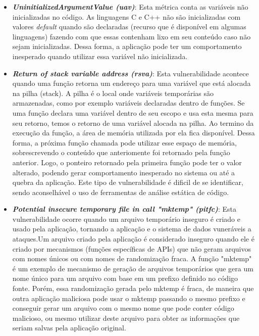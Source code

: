 \begin{itemize}
\item \textbf{\emph{UninitializedArgumentValue (uav)}}: Esta métrica conta as variáveis não inicializadas no código. As linguagens C e C++ não são inicializadas com valores \emph{default} quando são declaradas (recurso que é disponível em algumas linguagens) fazendo com que essas contenham lixo em seu conteúdo caso não sejam inicializadas. Dessa forma, a aplicação pode ter um comportamento inesperado quando utilizar essa variável não inicializada.

%

\item \textbf{\emph{Return of stack variable address (rsva)}}: Esta vulnerabilidade acontece quando uma função retorna um endereço para uma variável que está alocada na pilha (stack). A pilha é o local onde variáveis temporárias são armazenadas, como por exemplo variáveis declaradas dentro de funções. Se uma função declara uma variável dentro de seu escopo e usa esta mesma para seu retorno, temos o retorno de uma variável alocada na pilha. Ao termino da execução da função, a área de memória utilizada por ela fica disponível. Dessa forma, a próxima função chamada pode utilizar esse espaço de memória, sobrescrevendo o conteúdo que anteriomente foi retornado pela função anterior. Logo, o ponteiro retornado pela primeira função pode ter o valor alterado, podendo gerar comportamento inesperado no sistema ou até a quebra da aplicação. Este tipo de vulnerabilidade é dificil de se identificar, sendo aconselhável o uso de ferramentas de análise estática de código.

%

\item \textbf{\emph{Potential insecure temporary file in call "mktemp" (pitfc)}}: Esta vulnerabilidade ocorre quando um arquivo temporário inseguro é criado e usado pela aplicação, tornando a aplicação e o sistema de dados vuneráveis a ataques.Um arquivo criado pela aplicação é considerado inseguro quando ele é criado por mecanismos (funções específicas de APIs) que não geram arquivos com nomes únicos ou com nomes de randomização fraca. A função "mktemp" é um exemplo de mecanismo de geração de arquivos temporários que gera um nome único para um arquivo com base em um prefixo definido no código fonte. Porém, essa randomização gerada pelo mktemp é fraca, de maneira que outra aplicação maliciosa pode usar o mktemp passando o mesmo prefixo e conseguir gerar um arquivo com o mesmo nome que pode conter código malicioso, ou mesmo utilizar deste arquivo para obter as informações que seriam salvas pela aplicação original.


\end{itemize}
